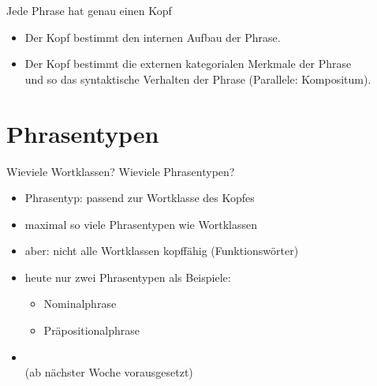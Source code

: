 \begin{frame}
  {Jede Phrase hat genau einen Kopf}
  \pause
  \pause
  \Halbzeile
  \begin{itemize}[<+->]
    \item Der Kopf bestimmt den \alert{internen Aufbau} der Phrase.
    \item Der Kopf bestimmt die \alert{externen kategorialen Merkmale} der Phrase\\
      und so das syntaktische Verhalten der Phrase (Parallele: \alert{Kompositum}).
  \end{itemize}
\end{frame}


\section{Phrasentypen}

\begin{frame}
  {Wieviele Wortklassen? Wieviele Phrasentypen?}
  \pause
  \begin{itemize}[<+->]
    \item \alert{Phrasentyp: passend zur Wortklasse des Kopfes}
    \item maximal so viele Phrasentypen wie Wortklassen
    \item aber: nicht alle Wortklassen kopffähig (\alert{Funktionswörter})
      \Zeile
    \item heute nur zwei Phrasentypen als Beispiele:
      \begin{itemize}[<+->]
        \item Nominalphrase
        \item Präpositionalphrase
      \end{itemize}
    \item {}\\
      (ab nächster Woche vorausgesetzt)
  \end{itemize}
\end{frame}

